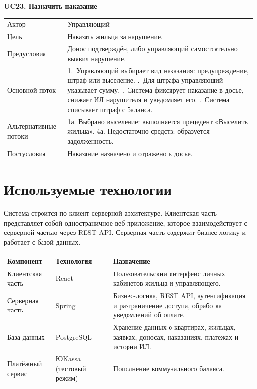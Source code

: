 \documentclass[12pt,a4paper]{article}
\makeatletter
\newenvironment{uctable}[1]{%
  \par\medskip\noindent\begin{minipage}{\linewidth}
  \textbf{#1}\par\smallskip
  \renewcommand{\arraystretch}{1.25}%
  \begin{tabular}{@{}L{38mm} L{124mm}@{}}
  \toprule
}{%
  \bottomrule
  \end{tabular}
  \end{minipage}\par\medskip
}
\makeatother
\begin{document}
\begin{uctable}{UC23. Назначить наказание}
Актор & Управляющий \\
Цель & Наказать жильца за нарушение. \\
Предусловия & Донос подтверждён, либо управляющий самостоятельно выявил нарушение. \\
Основной поток & 1.~Управляющий выбирает вид наказания: предупреждение, штраф или выселение. .~Для штрафа управляющий указывает сумму. .~Система фиксирует наказание в досье, снижает ИЛ нарушителя и уведомляет его. .~Система списывает штраф с баланса. \\
Альтернативные потоки & 1а. Выбрано выселение: выполняется прецедент «Выселить жильца». \newline 4а. Недостаточно средств: образуется задолженность. \\
Постусловия & Наказание назначено и отражено в досье. \\
\end{uctable}

\section{Используемые технологии}

Система строится по клиент-серверной архитектуре. Клиентская часть
представляет собой одностраничное веб-приложение, которое взаимодействует
с серверной частью через REST API. Серверная часть содержит бизнес-логику
и работает с базой данных.

\begin{longtable}{L{30mm} L{38mm} L{85mm}}
\toprule
\textbf{Компонент} & \textbf{Технология} & \textbf{Назначение} \\
\midrule
\endhead
\bottomrule
\endfoot
Клиентская часть & React & Пользовательский интерфейс личных кабинетов жильца и управляющего. \\
Серверная часть & Spring & Бизнес-логика, REST API, аутентификация и разграничение доступа, обработка уведомлений об оплате. \\
База данных & PostgreSQL & Хранение данных о квартирах, жильцах, заявках, доносах, наказаниях, платежах и истории ИЛ. \\
Платёжный сервис & ЮKassa (тестовый режим) & Пополнение коммунального баланса. \\
\end{longtable}
\end{document}
